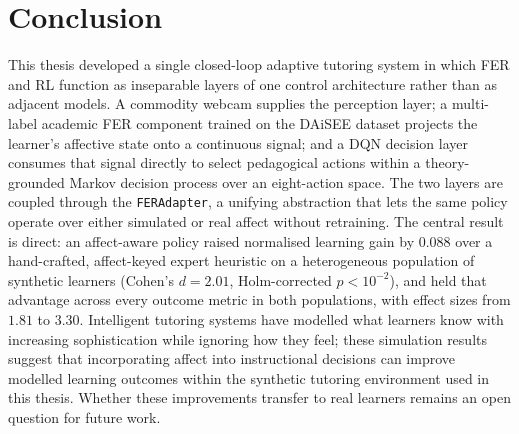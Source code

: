 \chapter{Conclusion}\label{chap:concl}

This thesis developed a single closed-loop adaptive tutoring system in which \ac{FER} and \ac{RL} function as inseparable layers of one control architecture rather than as adjacent models. A commodity webcam supplies the perception layer; a multi-label academic \ac{FER} component trained on the \ac{DAiSEE} dataset projects the learner's affective state onto a continuous signal; and a \ac{DQN} decision layer consumes that signal directly to select pedagogical actions within a theory-grounded Markov decision process over an eight-action space. The two layers are coupled through the \texttt{FERAdapter}, a unifying abstraction that lets the same policy operate over either simulated or real affect without retraining. The central result is direct: an affect-aware policy raised normalised learning gain by $0.088$ over a hand-crafted, affect-keyed expert heuristic on a heterogeneous population of synthetic learners (Cohen's $d = 2.01$, Holm-corrected $p < 10^{-2}$), and held that advantage across every outcome metric in both populations, with effect sizes from $1.81$ to $3.30$. Intelligent tutoring systems have modelled what learners know with increasing sophistication while ignoring how they feel; these simulation results suggest that incorporating affect into instructional decisions can improve modelled learning outcomes within the synthetic tutoring environment used in this thesis. Whether these improvements transfer to real learners remains an open question for future work.

